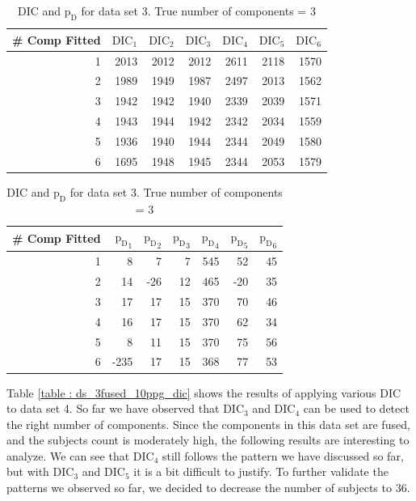\begin{table}[!htb]
\centering
\caption{DIC and $\text{p}_\text{D}$ for data set 3. True number of components = 3}
\label{table : ds_3wellsep_3ppg_dic}
\begin{tabular}{@{}rrrrrrr@{}}
\toprule
\# Comp Fitted & $\text{DIC}_1$ & $\text{DIC}_2$  & $\text{DIC}_3$  & $\text{DIC}_4$  & $\text{DIC}_5$  & $\text{DIC}_6$  \\ \midrule
1 & 2013 & 2012 & 2012 & 2611 & 2118 & 1570 \\
2 & 1989 & 1949 & 1987 & 2497 & 2013 & 1562 \\
3 & 1942 & 1942 & 1940 & 2339 & 2039 & 1571 \\
4 & 1943 & 1944 & 1942 & 2342 & 2034 & 1559 \\
5 & 1936 & 1940 & 1944 & 2344 & 2049 & 1580 \\
6 & 1695 & 1948 & 1945 & 2344 & 2053 & 1579 \\ \bottomrule
\end{tabular}

\begin{tabular}{@{}rrrrrrr@{}}
\toprule
\# Comp Fitted & ${\text{p}_\text{D}}_1$ & ${\text{p}_\text{D}}_2$ & ${\text{p}_\text{D}}_3$ & ${\text{p}_\text{D}}_4$ & ${\text{p}_\text{D}}_5$ & ${\text{p}_\text{D}}_6$ \\ \midrule
1 & 8 & 7 & 7 & 545 & 52 & 45 \\
2 & 14 & -26 & 12 & 465 & -20 & 35 \\
3 & 17 & 17 & 15 & 370 & 70 & 46 \\
4 & 16 & 17 & 15 & 370 & 62 & 34 \\
5 & 8 & 11 & 15 & 370 & 75 & 56 \\
6 & -235 & 17 & 15 & 368 & 77 & 53 \\ \bottomrule
\end{tabular}
\end{table}

Table \ref{table : ds_3fused_10ppg_dic} shows the results of applying various DIC to data set 4. So far we have observed that $\text{DIC}_3$ and $\text{DIC}_4$ can be used to detect the right number of components. Since the components in this data set are fused, and the subjects count is moderately high, the following results are interesting to analyze. We can see that $\text{DIC}_4$ still follows the pattern we have discussed so far, but with $\text{DIC}_3$ and $\text{DIC}_5$ it is a bit difficult to justify. To further validate the patterns we observed so far, we decided to decrease the number of subjects to 36.\\
 

